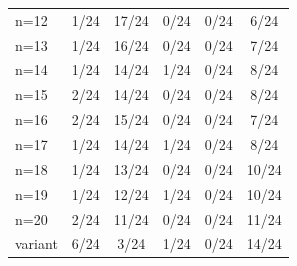 \begin{tabular}{lccccc}
n=12 & \cellcolor[HTML]{FFFFFF} 1/24 & \cellcolor[HTML]{EA4646} 17/24 & \cellcolor[HTML]{9670BD} 0/24 & \cellcolor[HTML]{8FEB32} 0/24 & \cellcolor[HTML]{19C8C8} 6/24 \\
n=13 & \cellcolor[HTML]{FFFFFF} 1/24 & \cellcolor[HTML]{EA4646} 16/24 & \cellcolor[HTML]{9670BD} 0/24 & \cellcolor[HTML]{8FEB32} 0/24 & \cellcolor[HTML]{19C8C8} 7/24 \\
n=14 & \cellcolor[HTML]{FFFFFF} 1/24 & \cellcolor[HTML]{EA4646} 14/24 & \cellcolor[HTML]{9670BD} 1/24 & \cellcolor[HTML]{8FEB32} 0/24 & \cellcolor[HTML]{19C8C8} 8/24 \\
n=15 & \cellcolor[HTML]{FFFFFF} 2/24 & \cellcolor[HTML]{EA4646} 14/24 & \cellcolor[HTML]{9670BD} 0/24 & \cellcolor[HTML]{8FEB32} 0/24 & \cellcolor[HTML]{19C8C8} 8/24 \\
n=16 & \cellcolor[HTML]{FFFFFF} 2/24 & \cellcolor[HTML]{EA4646} 15/24 & \cellcolor[HTML]{9670BD} 0/24 & \cellcolor[HTML]{8FEB32} 0/24 & \cellcolor[HTML]{19C8C8} 7/24 \\
n=17 & \cellcolor[HTML]{FFFFFF} 1/24 & \cellcolor[HTML]{EA4646} 14/24 & \cellcolor[HTML]{9670BD} 1/24 & \cellcolor[HTML]{8FEB32} 0/24 & \cellcolor[HTML]{19C8C8} 8/24 \\
n=18 & \cellcolor[HTML]{FFFFFF} 1/24 & \cellcolor[HTML]{EA4646} 13/24 & \cellcolor[HTML]{9670BD} 0/24 & \cellcolor[HTML]{8FEB32} 0/24 & \cellcolor[HTML]{19C8C8} 10/24 \\
n=19 & \cellcolor[HTML]{FFFFFF} 1/24 & \cellcolor[HTML]{EA4646} 12/24 & \cellcolor[HTML]{9670BD} 1/24 & \cellcolor[HTML]{8FEB32} 0/24 & \cellcolor[HTML]{19C8C8} 10/24 \\
n=20 & \cellcolor[HTML]{FFFFFF} 2/24 & \cellcolor[HTML]{EA4646} 11/24 & \cellcolor[HTML]{9670BD} 0/24 & \cellcolor[HTML]{8FEB32} 0/24 & \cellcolor[HTML]{19C8C8} 11/24 \\
variant & \cellcolor[HTML]{FFFFFF} 6/24 & \cellcolor[HTML]{EA4646} 3/24 & \cellcolor[HTML]{9670BD} 1/24 & \cellcolor[HTML]{8FEB32} 0/24 & \cellcolor[HTML]{19C8C8} 14/24 \\
\bottomrule
\end{tabular}
